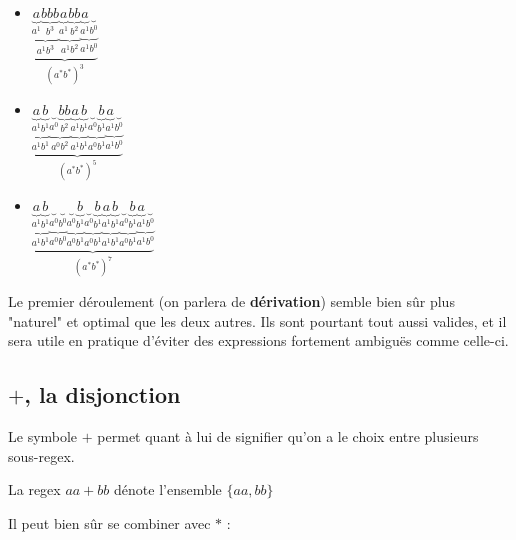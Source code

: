 \begin{itemize}
    \item $\underbrace{\underbrace{\underbrace{a}_\text{$a^1$}\underbrace{bbb}_\text{$b^3$}}_\text{$a^1b^3$}\underbrace{\underbrace{a}_\text{$a^1$}\underbrace{bb}_\text{$b^2$}}_\text{$a^1b^2$}\underbrace{\underbrace{a}_\text{$a^1$}\underbrace{ }_\text{$b^0$}}_\text{$a^1b^0$}}_\text{$(a^*b^*)^3$}$   
    \item $\underbrace{\underbrace{\underbrace{a}_\text{$a^1$}\underbrace{b}_\text{$b^1$}}_\text{$a^1b^1$}\underbrace{\underbrace{ }_\text{$a^0$}\underbrace{bb}_\text{$b^2$}}_\text{$a^0b^2$}\underbrace{\underbrace{a}_\text{$a^1$}\underbrace{b }_\text{$b^1$}}_\text{$a^1b^1$}\underbrace{\underbrace{ }_\text{$a^0$}\underbrace{b }_\text{$b^1$}}_\text{$a^0b^1$}\underbrace{\underbrace{a}_\text{$a^1$}\underbrace{  }_\text{$b^0$}}_\text{$a^1b^0$}}_\text{$(a^*b^*)^5$}$
   
    \item $\underbrace{\underbrace{\underbrace{a}_\text{$a^1$}\underbrace{b}_\text{$b^1$}}_\text{$a^1b^1$}\underbrace{\underbrace{ }_\text{$a^0$}\underbrace{ }_\text{$b^0$}}_\text{$a^0b^0$}\underbrace{\underbrace{ }_\text{$a^0$}\underbrace{b}_\text{$b^1$}}_\text{$a^0b^1$}\underbrace{\underbrace{ }_\text{$a^0$}\underbrace{b}_\text{$b^1$}}_\text{$a^0b^1$}\underbrace{\underbrace{a}_\text{$a^1$}\underbrace{b }_\text{$b^1$}}_\text{$a^1b^1$}\underbrace{\underbrace{ }_\text{$a^0$}\underbrace{b }_\text{$b^1$}}_\text{$a^0b^1$}\underbrace{\underbrace{a}_\text{$a^1$}\underbrace{  }_\text{$b^0$}}_\text{$a^1b^0$}}_\text{$(a^*b^*)^7$}$
\end{itemize}

Le premier déroulement (on parlera de \textbf{dérivation}) semble bien sûr plus "naturel" et optimal que les deux autres. Ils sont pourtant tout aussi valides, et il sera utile en pratique d'éviter des expressions fortement ambiguës comme celle-ci.


\subsection{$+$, la disjonction}

Le symbole $+$ permet quant à lui de signifier qu'on a le choix entre plusieurs sous-regex.

\begin{example}
La regex $aa+bb$ dénote l'ensemble $\{aa,bb\}$
\end{example}

Il peut bien sûr se combiner avec $*$ :

